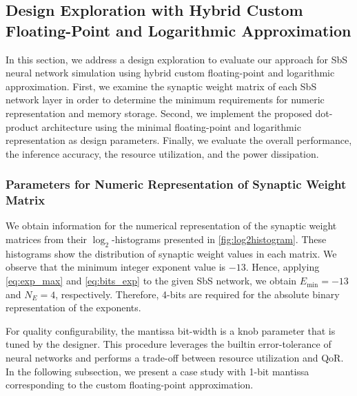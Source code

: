 \subsection{Design Exploration with Hybrid Custom Floating-Point and Logarithmic Approximation}

In this section, we address a design exploration to evaluate our approach for SbS neural network simulation using hybrid custom floating-point and logarithmic approximation. First, we examine the synaptic weight matrix of each SbS network layer in order to determine the minimum requirements for numeric representation and memory storage. Second, we implement the proposed dot-product architecture using the minimal floating-point and logarithmic representation as design parameters. Finally, we evaluate the overall performance, the inference accuracy, the resource utilization, and the power dissipation.

\subsubsection{Parameters for Numeric Representation of Synaptic Weight Matrix}
\label{sec:parameters}

	We obtain information for the numerical representation of the synaptic weight matrices from their $\log_2$-histograms presented in {\ref{fig:log2histogram}}. These histograms show the distribution of synaptic weight values in each matrix. We observe that the minimum integer exponent value is $-13$. Hence, applying {\ref{eq:exp_max}} and {\ref{eq:bits_exp}} to the given SbS network, we obtain $E_{\min}=-13$ and $N_E=4$, respectively. Therefore, 4-bits are required for the absolute binary representation of the exponents.


For quality configurability, the mantissa bit-width is a knob parameter that is tuned by the designer. This procedure leverages the builtin error-tolerance of neural networks and performs a trade-off between resource utilization and QoR. In the following subsection, we present a case study with 1-bit mantissa corresponding to the custom floating-point approximation.

